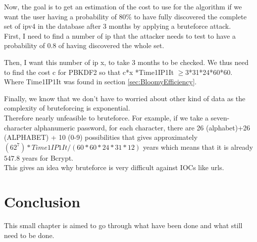 \documentclass{eplmastersthesis}
\begin{document}
Now, the goal is to get an estimation of the cost to use for the algorithm if we want the user having a probability of 80\% to have fully discovered the complete set of \gls{ipv4} in the database after 3 months by applying a bruteforce attack.\\
First, I need to find a number of \gls{ip} that the attacker needs to test to have a probability of 0.8 of having discovered the whole set.\\


Then, I want this number of \gls{ip} x, to take 3 months to be checked. We thus need to find the cost c for PBKDF2 so that c*x *Time1IP1It $\geq$3*31*24*60*60. Where Time1IP1It was found in section \ref{sec:BloomyEfficiency}.\\


Finally, we know that we don't have to worried about other kind of data as the complexity of bruteforcing is exponential.\\
Therefore nearly unfeasible to bruteforce. For example, if we take a seven-character alphanumeric password, for each character, there are 26 (alphabet)+26 (ALPHABET) + 10 (0-9) possibilities that gives approximately $(62^7)*Time1IP1It/(60*60*24*31*12)$ years which means that it is already $547.8$ years for Bcrypt.\\
This gives an idea why bruteforce is very difficult against IOCs like \gls{url}s.\\ 

\chapter{Conclusion}

This small chapter is aimed to go through what have been done and what still need to be done.
\end{document}
